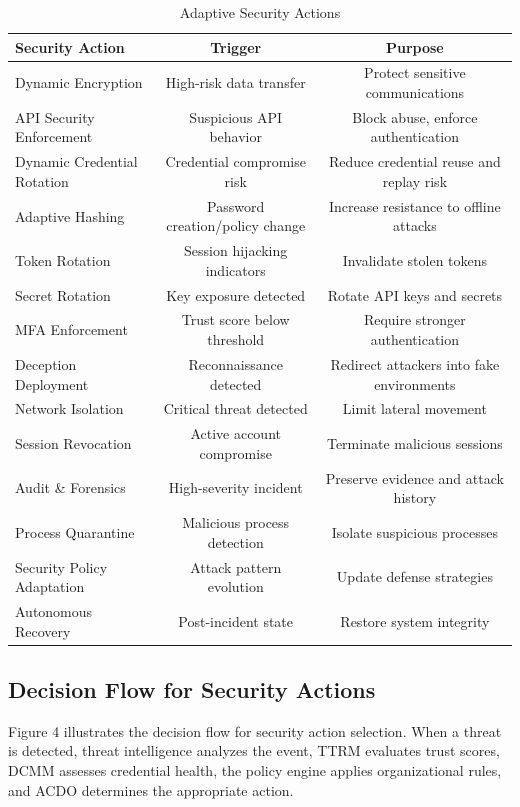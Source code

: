 \documentclass[12pt]{article}
\begin{document}
\begin{table}[H]
\centering
\caption{Adaptive Security Actions}
\small
\begin{tabular}{|l|c|c|}
\hline
\textbf{Security Action} & \textbf{Trigger} & \textbf{Purpose} \\
\hline
Dynamic Encryption & High-risk data transfer & Protect sensitive communications \\
API Security Enforcement & Suspicious API behavior & Block abuse, enforce authentication \\
Dynamic Credential Rotation & Credential compromise risk & Reduce credential reuse and replay risk \\
Adaptive Hashing & Password creation/policy change & Increase resistance to offline attacks \\
Token Rotation & Session hijacking indicators & Invalidate stolen tokens \\
Secret Rotation & Key exposure detected & Rotate API keys and secrets \\
MFA Enforcement & Trust score below threshold & Require stronger authentication \\
Deception Deployment & Reconnaissance detected & Redirect attackers into fake environments \\
Network Isolation & Critical threat detected & Limit lateral movement \\
Session Revocation & Active account compromise & Terminate malicious sessions \\
Audit \& Forensics & High-severity incident & Preserve evidence and attack history \\
Process Quarantine & Malicious process detection & Isolate suspicious processes \\
Security Policy Adaptation & Attack pattern evolution & Update defense strategies \\
Autonomous Recovery & Post-incident state & Restore system integrity \\
\hline
\end{tabular}
\label{tab:security_actions}
\end{table}

\subsection{Decision Flow for Security Actions}
Figure 4 illustrates the decision flow for security action selection. When a threat is detected, threat intelligence analyzes the event, TTRM evaluates trust scores, DCMM assesses credential health, the policy engine applies organizational rules, and ACDO determines the appropriate action.
\end{document}
